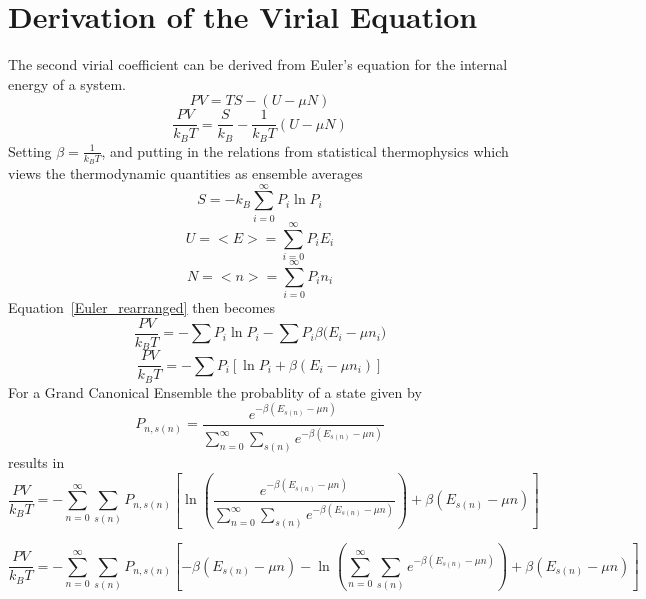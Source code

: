 \documentclass[double,12pt]{beavtex}
\begin{document}
\section{Derivation of the Virial Equation}
The second virial coefficient can be derived from Euler's equation for 
the internal energy of a system.
\begin{equation}PV=TS-(U-\mu{N})\end{equation}
\begin{equation}\label{Euler_rearranged}\frac{PV}{k_BT}=\frac{S}{k_B}-\frac{1}{k_BT}(U-\mu{N})\end{equation}
Setting $\beta=\frac{1}{k_BT}$, and putting in the relations from statistical 
thermophysics which views the thermodynamic quantities as ensemble averages
\begin{equation}S=-k_B\sum_{i=0}^\infty{P_i\ln{P_i}}\end{equation}
\begin{equation}U=<E>=\sum_{i=0}^\infty{P_iE_i}\end{equation}
\begin{equation}N=<n>=\sum_{i=0}^\infty{P_in_i}\end{equation}
Equation~\ref{Euler_rearranged} then becomes
\begin{equation}\frac{PV}{k_BT}=-\sum{P_i\ln{P_i}}-\sum{P_i\beta(E_i-\mu
{n_i}})\end{equation}
\begin{equation}\frac{PV}{k_BT}=-\sum{P_i}\left[\ln{P_i}+\beta(E_i-\mu
{n_i})\right]\end{equation}
For a Grand Canonical Ensemble the probablity of a state given by
\begin{equation}P_{n,s(n)}=\frac{e^{-\beta(E_{s(n)}-\mu{n})}}{\sum_{n=0}^\infty\sum_{s(n)}e^{-\beta(E_{s(n)}-\mu{n})}}\end{equation}
results in 
\begin{equation}\frac{PV}{k_BT}=-\sum_{n=0}^\infty\sum_{s(n)}P_{n,s(n)}\left[\ln{\left(\frac{ e^{-\beta(E_{s(n)}-\mu{n})}}{\sum_{n=0}^\infty\sum_{s(n)}e^{-\beta(E_{s(n)}-\mu{n})}}\right)}+\beta(E_{s(n)}-\mu{n})\right]\end{equation}

\begin{equation}\frac{PV}{k_BT}=-\sum_{n=0}^\infty\sum_{s(n)}P_{n,s(n)}\left[-\beta(E_{s(n)}-\mu{n})-\ln{\left(\sum_{n=0}^\infty\sum_{s(n)}e^{-\beta(E_{s(n)}-\mu{n})}\right)}+\beta(E_{s(n)}-\mu{n})\right]\end{equation}
\end{document}
